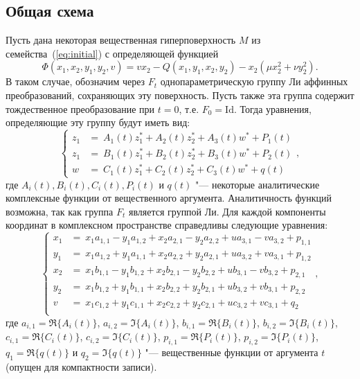 \documentclass[a4paper,14pt]{extarticle}
\begin{document}
\subsection{Общая схема}
Пусть дана некоторая вещественная гиперповерхность $M$ из семейства~(\ref{eq:initial}) с определяющей функцией $$\Phi(x_1, x_2, y_1, y_2, v) = v x_2 - Q(x_1, y_1, x_2, y_2) - x_2 (\mu x_2^2 + \nu y_2^2).$$ В таком случае, обозначим через $F_t$ однопараметрическую группу Ли аффинных преобразований, сохраняющих эту поверхность. Пусть также эта группа содержит тождественное преобразование при $t = 0$, т.е. $F_0 = \textrm{Id}$. Тогда уравнения, определяющие эту группу будут иметь вид:
\begin{equation}
  \begin{cases}
     z_1 &=~A_{1}(t) z_1^* + A_{2}(t) z_2^* + A_{3}(t) w^* + P_1(t) \\ 
     z_1 &=~B_{1}(t) z_1^* + B_{2}(t) z_2^* + B_{3}(t) w^* + P_2(t) \\ 
     w   &=~C_{1}(t) z_1^* + C_{2}(t) z_2^* + C_{3}(t) w^* + q(t)
  \end{cases},
\end{equation}
где $A_{i}(t), B_{i}(t), C_{i}(t), P_i(t)$ и $q(t)$ "--- некоторые аналитические комплексные функции от вещественного аргумента. Аналитичность функций возможна, так как группа $F_t$ является группой Ли. Для каждой компоненты координат в комплексном пространстве справедливы следующие уравнения:
\begin{equation}\label{eq:coordinates_transform}
  \begin{cases}
     x_1 &=~x_1 a_{1,1} - y_1 a_{1,2} + x_2 a_{2,1} - y_2 a_{2,2} + u a_{3,1} - v a_{3,2} + p_{1,1} \\ 
     y_1 &=~x_1 a_{1,2} + y_1 a_{1,1} + x_2 a_{2,2} + y_2 a_{2,1} + u a_{3,2} + v a_{3,1} + p_{1,2} \\
     x_2 &=~x_1 b_{1,1} - y_1 b_{1,2} + x_2 b_{2,1} - y_2 b_{2,2} + u b_{3,1} - v b_{3,2} + p_{2,1}\\
     y_2 &=~x_1 b_{1,2} + y_1 b_{1,1} + x_2 b_{2,2} + y_2 b_{2,1} + u b_{3,2} + v b_{3,1} + p_{2,2}\\
     v   &=~x_1 c_{1,2} + y_1 c_{1,1} + x_2 c_{2,2} + y_2 c_{2,1} + u c_{3,2} + v c_{3,1}+q_2\\
  \end{cases},
\end{equation}
где $a_{i, 1} = \Re\{A_i(t)\}$, $a_{i, 2} = \Im\{A_i(t)\}$, $b_{i, 1} = \Re\{B_i(t)\}$, $b_{i, 2} = \Im\{B_i(t)\}$, $c_{i, 1} = \Re\{C_i(t)\}$, $c_{i, 2} = \Im\{C_i(t)\}$, $p_{i, 1} = \Re\{P_i(t)\}$, $p_{i, 2} = \Im\{P_i(t)\}$, $q_1 = \Re\{q(t)\}$ и $q_2 = \Im\{q(t)\}$ "--- вещественные функции от аргумента $t$ (опущен для компактности записи). 
\end{document}
